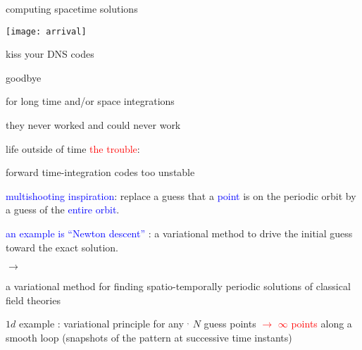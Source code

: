 \begin{frame}{computing spacetime solutions}
\begin{center}
\texttt{[image: arrival]}
\end{center}
\end{frame}

\begin{frame}{kiss your DNS codes}
\begin{center}
{\huge goodbye}
\end{center}

\vfill

for long time and/or space integrations

\medskip

\hfill they never worked and could never work
\end{frame}

\begin{frame}{life outside of time}
\textcolor{red}{the trouble}:

forward time-integration codes too unstable

\bigskip
\bigskip

\textcolor{blue}{multishooting inspiration}:
 replace a guess that a  \textcolor{blue}{point} is on the periodic
orbit by a guess of the \textcolor{blue}{entire orbit}.

\bigskip

\textcolor{blue}{an example is ``Newton descent''} :
a variational method
to drive the initial guess toward the exact solution.

\bigskip

$\to$

\bigskip

a variational method for finding
spatio-temporally periodic solutions of classical field theories
\end{frame}

\begin{frame}{$1d$ example : variational principle for any {\po}
    $^,$
}
$N$ guess points \textcolor{red}{$\to$ $\infty$ points}
along a smooth loop
(snapshots of the pattern at successive time instants)%
\end{frame}


